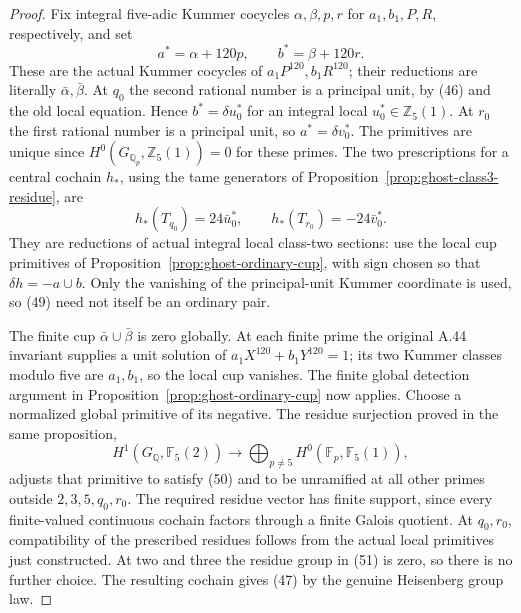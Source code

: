 \begin{proof}
Fix integral five-adic Kummer cocycles
\(\alpha,\beta,p,r\) for \(a_1,b_1,P,R\),
respectively, and set
\[
 a^*=\alpha+120p,\qquad b^*=\beta+120r.
                                                        \tag{49}
\]
These are the actual Kummer cocycles of
\(a_1P^{120},b_1R^{120}\); their reductions are
literally \(\bar\alpha,\bar\beta\).
At \(q_0\) the second rational number is a principal
unit, by (46) and the old local equation. Hence
\(b^*=\delta u_0^*\) for an integral local
\(u_0^*\in\mathbb Z_5(1)\).
At \(r_0\) the first rational number is a principal
unit, so \(a^*=\delta v_0^*\).
The primitives are unique since
\(H^0(G_{\mathbb Q_p},\mathbb Z_5(1))=0\)
for these primes. The two prescriptions for a central
cochain \(h_*\), using the tame generators of
Proposition~\ref{prop:ghost-class3-residue}, are
\[
 h_*(T_{q_0})=24\bar u_0^*,\qquad
 h_*(T_{r_0})=-24\bar v_0^*.                           \tag{50}
\]
They are reductions of actual integral local class-two
sections: use the local cup primitives of
Proposition~\ref{prop:ghost-ordinary-cup}, with sign
chosen so that \(\delta h=-a\cup b\). Only the
vanishing of the principal-unit Kummer coordinate is
used, so (49) need not itself be an ordinary pair.

The finite cup \(\bar\alpha\cup\bar\beta\) is
zero globally. At each finite prime the original
A.44 invariant supplies a unit solution of
\(a_1X^{120}+b_1Y^{120}=1\); its two Kummer classes
modulo five are \(a_1,b_1\), so the local cup
vanishes. The finite global detection argument in
Proposition~\ref{prop:ghost-ordinary-cup} now applies.
Choose a normalized global primitive of its negative.
The residue surjection proved in the same proposition,
\[
 H^1(G_{\mathbb Q},\mathbb F_5(2))\longrightarrow
 \bigoplus_{p\ne5}H^0(\mathbb F_p,\mathbb F_5(1)),
                                                        \tag{51}
\]
adjusts that primitive to satisfy (50) and to be
unramified at all other primes outside
\(2,3,5,q_0,r_0\). The required residue vector has
finite support, since every finite-valued continuous
cochain factors through a finite Galois quotient.
At \(q_0,r_0\), compatibility of the prescribed
residues follows from the actual local primitives
just constructed. At two and three the residue group
in (51) is zero, so there is no further choice.
The resulting cochain gives (47) by the genuine
Heisenberg group law.


\end{proof}
